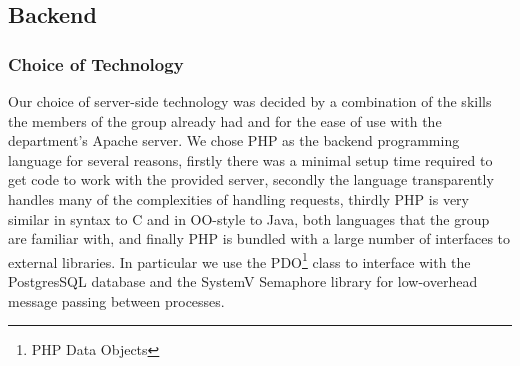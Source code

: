 \documentclass[12pt]{amsart}
\begin{document}
  \subsection{Backend}
    \subsubsection{Choice of Technology}
      \begin{flushleft}
        Our choice of server-side technology was decided by a combination of the
        skills the members of the group already had and for the ease of use with
        the department's Apache server. We chose PHP as the backend programming
        language for several reasons, firstly there was a minimal setup time
        required to get code to work with the provided server, secondly the
        language transparently handles many of the complexities of handling
        requests, thirdly PHP is very similar in syntax to C and in OO-style to
        Java, both languages that the group are familiar with, and finally PHP is
        bundled with a large number of interfaces to external libraries.  In
        particular we use the PDO\footnote{PHP Data Objects} class to interface
        with the PostgresSQL database and the SystemV Semaphore library for
        low-overhead message passing between processes.
      \end{flushleft}
\end{document}
